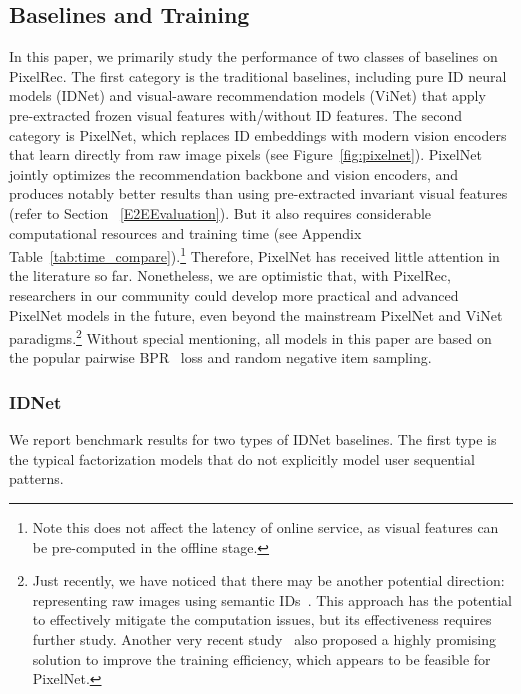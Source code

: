 \documentclass[sigconf]{acmart}
\begin{document}
\subsection{Baselines and Training}
  In this paper, we primarily study the performance of two  classes of baselines on PixelRec.
The first category is the traditional baselines, including pure
ID neural models (IDNet) and visual-aware recommendation models (ViNet) that apply pre-extracted frozen visual features with/without ID features.
The second category is PixelNet, which replaces ID embeddings with modern vision encoders that learn  directly from raw image pixels (see Figure~\ref{fig:pixelnet}).
PixelNet jointly optimizes the recommendation backbone and vision encoders, and produces notably better results than using  pre-extracted invariant visual features (refer to Section ~\ref{E2EEvaluation}). But it also requires considerable computational resources and training time (see Appendix Table~\ref{tab:time_compare}).\footnote{Note this does not affect the latency of online service, as visual features can be pre-computed in the offline stage.} Therefore, PixelNet has received little attention in the literature so far.
Nonetheless, we are optimistic that, with PixelRec, researchers in our community could develop more practical and advanced PixelNet models in the future,  even beyond the mainstream PixelNet and ViNet paradigms.\footnote{Just recently, we have noticed that there may be another potential direction: representing raw images using semantic IDs~\cite{Rajput2023gen,petrov2023generative}. This approach has the potential to effectively mitigate the computation issues, but its effectiveness requires further study.
Another very recent study~\cite{yang2022gram} also proposed a highly promising solution to improve the training efficiency, which appears to be feasible for PixelNet.
} 
Without special mentioning, all models in this paper are based on the popular pairwise BPR~\cite{rendle2012bpr} loss and random negative item sampling. 
 

\subsubsection{IDNet}
We report benchmark  results for two  types of IDNet baselines. The first type is the typical factorization models that do not explicitly model user sequential patterns.
\end{document}
